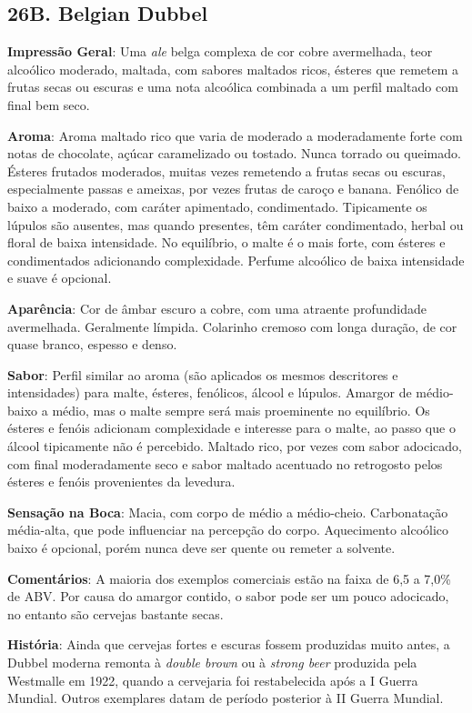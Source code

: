 \subsection*{26B. Belgian Dubbel}
\textbf{Impressão Geral}: Uma \textit{ale} belga complexa de cor cobre avermelhada, teor alcoólico moderado, maltada, com sabores maltados ricos, ésteres que remetem a frutas secas ou escuras e uma nota alcoólica combinada a um perfil maltado com final bem seco.

\textbf{Aroma}: Aroma maltado rico que varia de moderado a moderadamente forte com notas de chocolate, açúcar caramelizado ou tostado. Nunca torrado ou queimado. Ésteres frutados moderados, muitas vezes remetendo a frutas secas ou escuras, especialmente passas e ameixas, por vezes frutas de caroço e banana. Fenólico de baixo a moderado, com caráter apimentado, condimentado. Tipicamente os lúpulos são ausentes, mas quando presentes, têm caráter condimentado, herbal ou floral de baixa intensidade. No equilíbrio, o malte é o mais forte, com ésteres e condimentados adicionando complexidade. Perfume alcoólico de baixa intensidade e suave é opcional.

\textbf{Aparência}: Cor de âmbar escuro a cobre, com uma atraente profundidade avermelhada. Geralmente límpida. Colarinho cremoso com longa duração, de cor quase branco, espesso e denso.

\textbf{Sabor}: Perfil similar ao aroma (são aplicados os mesmos descritores e intensidades) para malte, ésteres, fenólicos, álcool e lúpulos. Amargor de médio-baixo a médio, mas o malte sempre será mais proeminente no equilíbrio. Os ésteres e fenóis adicionam complexidade e interesse para o malte, ao passo que o álcool tipicamente não é percebido. Maltado rico, por vezes com sabor adocicado, com final moderadamente seco e sabor maltado acentuado no retrogosto pelos ésteres e fenóis provenientes da levedura.

\textbf{Sensação na Boca}: Macia, com corpo de médio a médio-cheio. Carbonatação média-alta, que pode influenciar na percepção do corpo. Aquecimento alcoólico baixo é opcional, porém nunca deve ser quente ou remeter a solvente.

\textbf{Comentários}: A maioria dos exemplos comerciais estão na faixa de 6,5 a 7,0\% de ABV. Por causa do amargor contido, o sabor pode ser um pouco adocicado, no entanto são cervejas bastante secas.

\textbf{História}: Ainda que cervejas fortes e escuras fossem produzidas muito antes, a Dubbel moderna remonta à \textit{double brown} ou à \textit{strong beer} produzida pela Westmalle em 1922, quando a cervejaria foi restabelecida após a I Guerra Mundial. Outros exemplares datam de período posterior à II Guerra Mundial.

